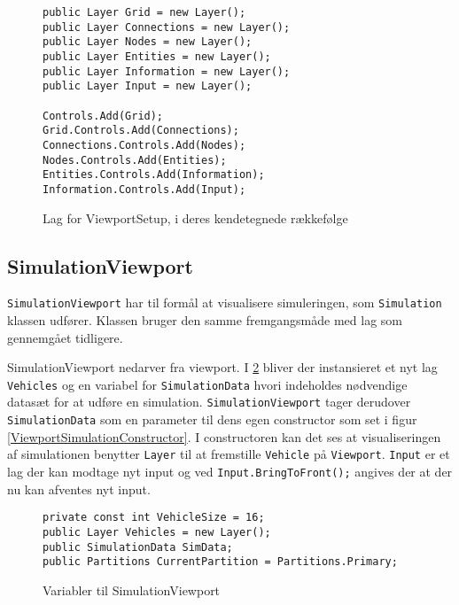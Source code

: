 \begin{figure}[H]
\begin{lstlisting}
public Layer Grid = new Layer();
public Layer Connections = new Layer();
public Layer Nodes = new Layer();
public Layer Entities = new Layer();
public Layer Information = new Layer();
public Layer Input = new Layer();

Controls.Add(Grid);
Grid.Controls.Add(Connections);
Connections.Controls.Add(Nodes);
Nodes.Controls.Add(Entities);
Entities.Controls.Add(Information);
Information.Controls.Add(Input);
\end{lstlisting}
\caption{Lag for ViewportSetup, i deres kendetegnede rækkefølge}
\label{ViewportSetupLayers}
\end{figure}

\subsection{SimulationViewport}\label{SimulationViewport}

\texttt{SimulationViewport} har til formål at visualisere simuleringen, som \texttt{Simulation} klassen udfører. Klassen bruger den samme fremgangsmåde med lag som gennemgået tidligere.

\vspace{5mm}

SimulationViewport nedarver fra viewport. I \ref{ViewPortSimulation1} bliver der instansieret et nyt lag \texttt{Vehicles} og en variabel for \texttt{SimulationData} hvori indeholdes nødvendige datasæt for at udføre en simulation. \texttt{SimulationViewport} tager derudover \texttt{SimulationData} som en parameter til dens egen constructor som set i figur \ref{ViewportSimulationConstructor}. I constructoren kan det ses at visualiseringen af simulationen benytter \texttt{Layer} til at fremstille \texttt{Vehicle} på \texttt{Viewport}. \texttt{Input} er et lag der kan modtage nyt input og ved \texttt{Input.BringToFront();} angives der at der nu kan afventes nyt input. 

\begin{figure}[H]
\begin{lstlisting}
private const int VehicleSize = 16;
public Layer Vehicles = new Layer();
public SimulationData SimData;
public Partitions CurrentPartition = Partitions.Primary;
\end{lstlisting}
\caption{Variabler til SimulationViewport}
\label{ViewPortSimulation1}
\end{figure}

